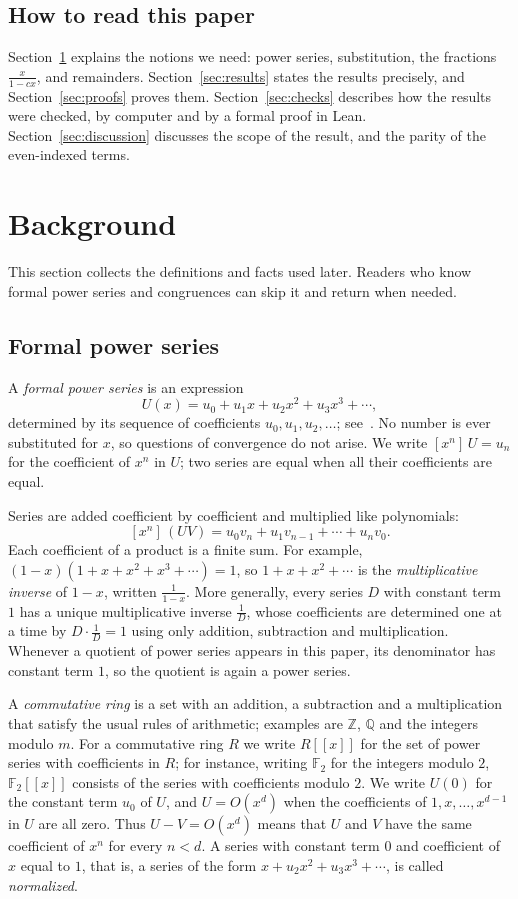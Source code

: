 \documentclass[11pt,a4paper]{article}
\theoremstyle{definition}
\theoremstyle{remark}
\newcommand{\Z}{\mathbb{Z}}
\newcommand{\Q}{\mathbb{Q}}
\newcommand{\F}{\mathbb{F}}
\newcommand{\ps}[1]{#1[[x]]}
\newcommand{\coeff}[2]{[x^{#1}]\,#2}
\begin{document}
\subsection{How to read this paper}
Section~\ref{sec:background} explains the notions we need: power series, substitution, the fractions
$\frac{x}{1-cx}$, and remainders. Section~\ref{sec:results} states the results precisely, and Section~\ref{sec:proofs}
proves them. Section~\ref{sec:checks} describes how the results were checked, by computer and by a formal proof in
Lean. Section~\ref{sec:discussion} discusses the scope of the result, and the parity of the even-indexed terms.
\section{Background}\label{sec:background}
This section collects the definitions and facts used later. Readers who know formal power series and congruences can skip it and return when needed.
\subsection{Formal power series}
A \emph{formal power series} is an expression
\[
U(x)=u_0+u_1x+u_2x^2+u_3x^3+\cdots ,
\]
determined by its sequence of coefficients $u_0,u_1,u_2,\dots$; see~\cite{niven,stanley}. No number is ever
substituted for $x$, so questions of convergence do not arise. We write $\coeff{n}{U}=u_n$ for the coefficient of $x^n$ in $U$; two series are equal
when all their coefficients are equal.

Series are added coefficient by coefficient and multiplied like polynomials:
\[
\coeff{n}{(UV)}=u_0v_n+u_1v_{n-1}+\cdots+u_nv_0 .
\]
Each coefficient of a product is a finite sum. For example, $(1-x)(1+x+x^2+x^3+\cdots)=1$, so $1+x+x^2+\cdots$ is
the \emph{multiplicative inverse} of $1-x$, written $\frac{1}{1-x}$. More generally, every series $D$ with constant term
$1$ has a unique multiplicative inverse $\frac1D$, whose coefficients are determined one at a time by $D\cdot\frac1D=1$
using only addition, subtraction and multiplication. Whenever a quotient of power series appears in this paper, its
denominator has constant term $1$, so the quotient is again a power series.

A \emph{commutative ring} is a set with an addition, a subtraction and a multiplication that satisfy the usual rules
of arithmetic; examples are $\Z$, $\Q$ and the integers modulo $m$. For a commutative ring $R$ we write $\ps{R}$ for
the set of power series with coefficients in $R$; for instance, writing $\F_2$ for the integers modulo $2$, $\ps{\F_2}$
consists of the series with coefficients modulo $2$. We write
$U(0)$ for the constant term $u_0$ of $U$, and $U=O(x^d)$ when the coefficients of $1,x,\dots,x^{d-1}$ in $U$ are all
zero. Thus $U-V=O(x^d)$ means that $U$ and $V$ have the same coefficient of $x^n$ for every $n<d$. A series with
constant term $0$ and coefficient of $x$ equal to $1$, that is, a series of the form $x+u_2x^2+u_3x^3+\cdots$, is
called \emph{normalized}.
\end{document}
